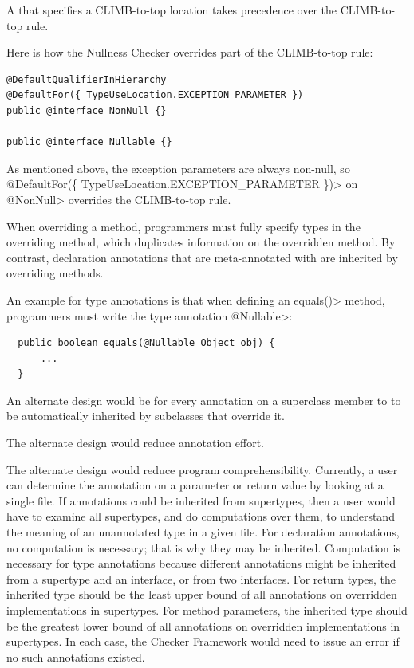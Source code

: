 A  that specifies a
CLIMB-to-top location takes precedence over the CLIMB-to-top rule.

Here is how the Nullness Checker overrides part of the CLIMB-to-top rule:

\begin{Verbatim}
@DefaultQualifierInHierarchy
@DefaultFor({ TypeUseLocation.EXCEPTION_PARAMETER })
public @interface NonNull {}

public @interface Nullable {}
\end{Verbatim}

\noindent
 As mentioned above, the exception parameters are always non-null, so
\<@DefaultFor(\{ TypeUseLocation.EXCEPTION\_PARAMETER \})> on \<@NonNull> overrides
the CLIMB-to-top rule.



When overriding a method, programmers must fully specify types in the overriding
method, which duplicates information on the overridden method.
By contrast, declaration annotations that are meta-annotated with
 are inherited by overriding methods.

An example for type annotations is that when defining an \<equals()>
method, programmers must write the type annotation \<@Nullable>:

\begin{Verbatim}
  public boolean equals(@Nullable Object obj) {
      ...
  }
\end{Verbatim}

An alternate design would be for every annotation on a superclass member to
to be automatically inherited by subclasses that override it.

The alternate design would reduce annotation effort.

The alternate design would reduce program comprehensibility.
Currently, a user can determine the annotation on a parameter or return
value by looking at a single file.  If annotations could be inherited from
supertypes, then a user would have to examine all supertypes, and do
computations over them, to understand the meaning of an unannotated type in
a given file.
For declaration annotations, no computation is necessary; that is why they
may be inherited.
Computation is necessary for type annotations because different annotations might be inherited
from a supertype and an interface, or from two interfaces.  For return
types, the inherited type should be the least upper bound of all
annotations on overridden implementations in supertypes.  For method
parameters, the inherited type should be the greatest lower bound of all
annotations on overridden implementations in supertypes.  In each case, the
Checker Framework would need to issue an error if no such annotations existed.


